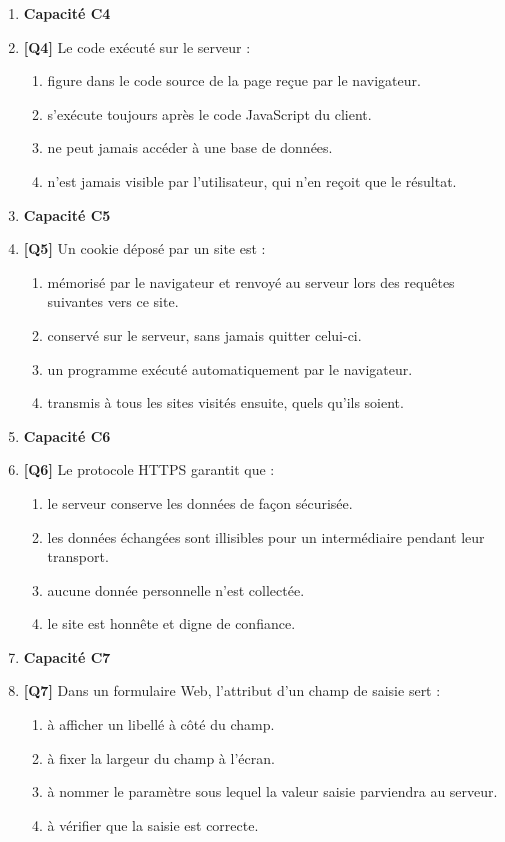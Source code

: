 \begin{enumerate}
\item[] \textbf{Capacité C4}

\item \textbf{[Q4]} Le code exécuté sur le serveur :
  \begin{enumerate}[label=\Alph*.]
    \item figure dans le code source de la page reçue par le navigateur.
    \item s'exécute toujours après le code JavaScript du client.
    \item ne peut jamais accéder à une base de données.
    \item n'est jamais visible par l'utilisateur, qui n'en reçoit que le résultat.
  \end{enumerate}

\item[] \textbf{Capacité C5}

\item \textbf{[Q5]} Un cookie déposé par un site est :
  \begin{enumerate}[label=\Alph*.]
    \item mémorisé par le navigateur et renvoyé au serveur lors des requêtes suivantes vers ce site.
    \item conservé sur le serveur, sans jamais quitter celui-ci.
    \item un programme exécuté automatiquement par le navigateur.
    \item transmis à tous les sites visités ensuite, quels qu'ils soient.
  \end{enumerate}

\item[] \textbf{Capacité C6}

\item \textbf{[Q6]} Le protocole HTTPS garantit que :
  \begin{enumerate}[label=\Alph*.]
    \item le serveur conserve les données de façon sécurisée.
    \item les données échangées sont illisibles pour un intermédiaire pendant leur transport.
    \item aucune donnée personnelle n'est collectée.
    \item le site est honnête et digne de confiance.
  \end{enumerate}

\item[] \textbf{Capacité C7}

\item \textbf{[Q7]} Dans un formulaire Web, l'attribut  d'un champ de saisie sert :
  \begin{enumerate}[label=\Alph*.]
    \item à afficher un libellé à côté du champ.
    \item à fixer la largeur du champ à l'écran.
    \item à nommer le paramètre sous lequel la valeur saisie parviendra au serveur.
    \item à vérifier que la saisie est correcte.
  \end{enumerate}


\end{enumerate}
